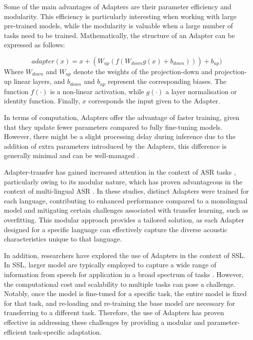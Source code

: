 Some of the main advantages of Adapters are their parameter efficiency and modularity. This efficiency is particularly interesting when working with large pre-trained models, while the modularity is valuable when a large number of tasks need to be trained.
Mathematically, the structure of an Adapter can be expressed as follows:

\begin{equation}
    adapter(x) = x + (W_{up}(f(W_{down}g(x)+b_{down})))+ b_{up})
\end{equation}
Where $W_{down}$ and $W_{up}$ denote the weights of the projection-down and projection-up linear layers, and $b_{down}$ and $b_{up}$ represent the corresponding biases. The function $f(\cdot)$ is a non-linear activation, while $g(\cdot)$ a layer normalisation or identity function. Finally, $x$ corresponds the input given to the Adapter.

In terms of computation, Adapters offer the advantage of faster training, given that they update fewer parameters compared to fully fine-tuning models. However, there might be a slight processing delay during inference due to the addition of extra parameters introduced by the Adapters, this difference is generally minimal and can be well-managed \cite{ruckle2020adapterdrop}.

Adapter-transfer has gained increased attention in the context of \ac{ASR} tasks \cite{cappellazzo2023parameter,chen2023efficient,10095837}, particularly owing to its modular nature, which has proven advantageous in the context of multi-lingual \ac{ASR} \cite{kannan2019large, hou2021exploiting, kulkarni2023adapting}. In these studies, distinct Adapters were trained for each language, contributing to enhanced performance compared to a monolingual model and mitigating certain challenges associated with transfer learning, such as overfitting. This modular approach provides a tailored solution, as each Adapter designed for a specific language can effectively capture the diverse acoustic characteristics unique to that language.

In addition, researchers have explored the use of Adapters in the context of \ac{SSL}. In \ac{SSL}, larger model are typically employed to capture a wide range of information from speech for application in a broad spectrum of tasks \cite{thomas2022efficient, fan2022draft}. However, the computational cost and scalability to multiple tasks can pose a challenge. Notably, once the model is fine-tuned for a specific task, the entire model is fixed for that task, and re-loading and re-training the base model are necessary for transferring to a different task. Therefore, the use of Adapters has proven effective in addressing these challenges by providing a modular and parameter-efficient task-specific adaptation.

